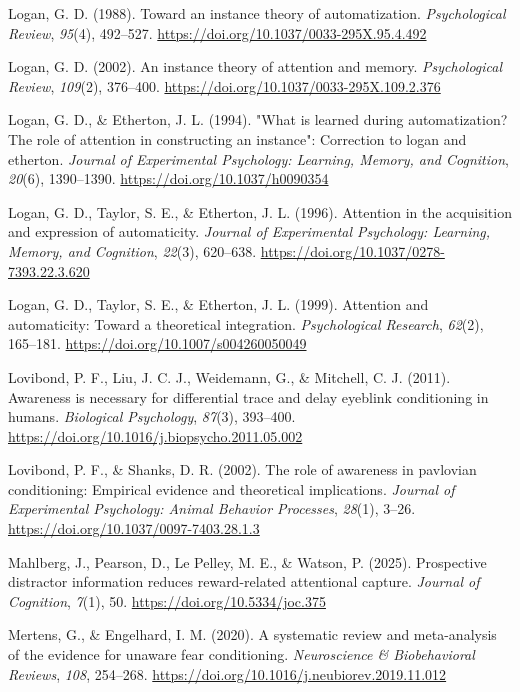 \documentclass[
  man,
  floatsintext,
  longtable,
  nolmodern,
  notxfonts,
  notimes,
  colorlinks=true,linkcolor=blue,citecolor=blue,urlcolor=blue]{apa7}
\newlength{\cslhangindent}
\newenvironment{CSLReferences}[2] %
 {\begin{list}{}{%
  \setlength{\itemindent}{0pt}
  \setlength{\leftmargin}{0pt}
  \setlength{\parsep}{0pt}
  \ifodd #1
   \setlength{\leftmargin}{\cslhangindent}
   \setlength{\itemindent}{-1\cslhangindent}
  \fi
  \setlength{\itemsep}{#2\baselineskip}}}
 {\end{list}}
\begin{document}
\begin{CSLReferences}{1}{0}
Logan, G. D. (1988). Toward an instance theory of automatization.
\emph{Psychological Review}, \emph{95}(4), 492--527.
\url{https://doi.org/10.1037/0033-295X.95.4.492}

Logan, G. D. (2002). An instance theory of attention and memory.
\emph{Psychological Review}, \emph{109}(2), 376--400.
\url{https://doi.org/10.1037/0033-295X.109.2.376}

Logan, G. D., \& Etherton, J. L. (1994). {"}What is learned during
automatization? The role of attention in constructing an instance{"}:
Correction to logan and etherton. \emph{Journal of Experimental
Psychology: Learning, Memory, and Cognition}, \emph{20}(6), 1390--1390.
\url{https://doi.org/10.1037/h0090354}

Logan, G. D., Taylor, S. E., \& Etherton, J. L. (1996). Attention in the
acquisition and expression of automaticity. \emph{Journal of
Experimental Psychology: Learning, Memory, and Cognition}, \emph{22}(3),
620--638. \url{https://doi.org/10.1037/0278-7393.22.3.620}

Logan, G. D., Taylor, S. E., \& Etherton, J. L. (1999). Attention and
automaticity: Toward a theoretical integration. \emph{Psychological
Research}, \emph{62}(2), 165--181.
\url{https://doi.org/10.1007/s004260050049}

Lovibond, P. F., Liu, J. C. J., Weidemann, G., \& Mitchell, C. J.
(2011). Awareness is necessary for differential trace and delay eyeblink
conditioning in humans. \emph{Biological Psychology}, \emph{87}(3),
393--400. \url{https://doi.org/10.1016/j.biopsycho.2011.05.002}

Lovibond, P. F., \& Shanks, D. R. (2002). The role of awareness in
pavlovian conditioning: Empirical evidence and theoretical implications.
\emph{Journal of Experimental Psychology: Animal Behavior Processes},
\emph{28}(1), 3--26. \url{https://doi.org/10.1037/0097-7403.28.1.3}

Mahlberg, J., Pearson, D., Le Pelley, M. E., \& Watson, P. (2025).
Prospective distractor information reduces reward-related attentional
capture. \emph{Journal of Cognition}, \emph{7}(1), 50.
\url{https://doi.org/10.5334/joc.375}

Mertens, G., \& Engelhard, I. M. (2020). A systematic review and
meta-analysis of the evidence for unaware fear conditioning.
\emph{Neuroscience \& Biobehavioral Reviews}, \emph{108}, 254--268.
\url{https://doi.org/10.1016/j.neubiorev.2019.11.012}


\end{CSLReferences}
\end{document}
